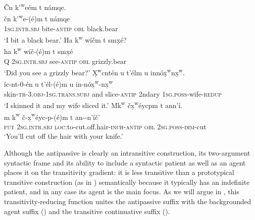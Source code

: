 \documentclass[output=paper,colorlinks,citecolor=brown]{langscibook}
\begin{document}
\ea 
\label{ex-thomason-14}
\v{C}n {k'\textsuperscript w}e\textglotstop\'em t n\textltilde\'amqe. \\
\gll \v{c}n {k'\textsuperscript w}e{\textglotstop}-(\'e)m t
n\textltilde\'amqe\\
\textsc{1sg}.\textsc{intr.sbj} bite-\textsc{antip} \textsc{obl}  black.bear \\
\glt `I bit a  black bear.'
\ex 
\label{ex-thomason-15}
Ha {k\textsuperscript w} w\'i\v{c}m t sm\d{x}\'e? \\
\gll ha k\textsuperscript w w\'i\v{c}-(\'e)m t sm\d{x}\'e\\ 
Q \textsc{2sg}.\textsc{intr.sbj} see-\textsc{antip} \textsc{obl} grizzly.bear\\
\glt `Did you see a grizzly bear?'
\ex
\label{ex-thomason-16}
{\d{X}\textsuperscript w}cnt\'en u t'\'elm {\textltilde}u inn\'o{\d{x}\textsuperscript w}n{\d{x}\textsuperscript w}.  \\
\'ic-nt-0-\'en u t'\'el-(\'e)m
{\textltilde}u in-n\'o{\d{x}\textsuperscript w}-n{\d{x}\textsuperscript w} \\
skin-\textsc{tr}-3.\textsc{obj}-1\textsc{sg}.\textsc{trans}.\textsc{subj} and slice-\textsc{antip} 2ndary \textsc{1sg}.\textsc{poss}-wife-\textsc{redup} \\
\glt `I skinned it and my wife sliced it.'
\ex 
\label{ex-thomason-17}
Mk\textsuperscript w \v{c}\d{x}\textsuperscript w\'eycpm t an{\textltilde}n'\'i. \\
 \gll m k{\textsuperscript w} \v{c}-\d{x}{\textsuperscript w}\'eyc-p-(\'e)m t
an-\textltilde-n'\'i\v{c}'\\ 
\textsc{fut} \textsc{2sg}.\textsc{intr.sbj} \textsc{loc:}to-cut.off.hair-\textsc{inch}-\textsc{antip} \textsc{obl} \textsc{2sg}.\textsc{poss}-\textsc{dim}-cut\\
 \glt `You'll cut off the hair with your knife.'
 \z


Although the antipassive is clearly an intransitive construction, its
two\hyp argument syntactic frame and its ability to include a syntactic
patient as well as an agent places it on the transitivity gradient: it
is less transitive than a prototypical transitive construction (as in
) semantically because it typically has an indefinite patient,
and in any case its agent is the main focus.  As we will argue in , this transitivity-reducing function unites the antipassive suffix
with the backgrounded agent suffix () and the transitive
continuative suffix ().
\end{document}
